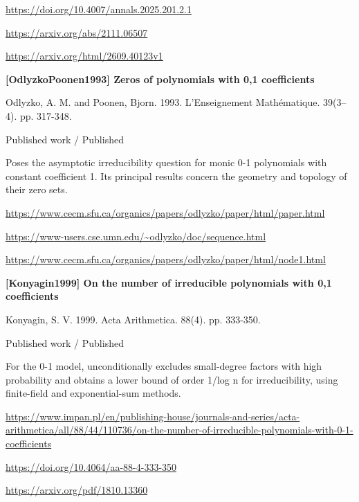 \documentclass[11pt,a4paper,oneside,openany]{book}
\begin{document}
{\footnotesize\url{https://doi.org/10.4007/annals.2025.201.2.1}}\par
{\footnotesize\url{https://arxiv.org/abs/2111.06507}}\par
{\footnotesize\url{https://arxiv.org/html/2609.40123v1}}\par
\vspace{9pt}
\hypertarget{ref:OdlyzkoPoonen1993}{}
{\sffamily\bfseries\color{atlasgreen}[OdlyzkoPoonen1993] Zeros of polynomials with 0,1 coefficients}\par
\color{black} Odlyzko, A. M. and Poonen, Bjorn. 1993. L'Enseignement Mathématique. 39(3--4). pp. 317-348.\par
{\small\sffamily\color{atlasgold}Published work / Published}\par
\color{black} Poses the asymptotic irreducibility question for monic 0-1 polynomials with constant coefficient 1. Its principal results concern the geometry and topology of their zero sets.\par
{\footnotesize\url{https://www.cecm.sfu.ca/organics/papers/odlyzko/paper/html/paper.html}}\par
{\footnotesize\url{https://www-users.cse.umn.edu/~odlyzko/doc/sequence.html}}\par
{\footnotesize\url{https://www.cecm.sfu.ca/organics/papers/odlyzko/paper/html/node1.html}}\par
\vspace{9pt}
\hypertarget{ref:Konyagin1999}{}
{\sffamily\bfseries\color{atlasgreen}[Konyagin1999] On the number of irreducible polynomials with 0,1 coefficients}\par
\color{black} Konyagin, S. V. 1999. Acta Arithmetica. 88(4). pp. 333-350.\par
{\small\sffamily\color{atlasgold}Published work / Published}\par
\color{black} For the 0-1 model, unconditionally excludes small-degree factors with high probability and obtains a lower bound of order 1/log n for irreducibility, using finite-field and exponential-sum methods.\par
{\footnotesize\url{https://www.impan.pl/en/publishing-house/journals-and-series/acta-arithmetica/all/88/44/110736/on-the-number-of-irreducible-polynomials-with-0-1-coefficients}}\par
{\footnotesize\url{https://doi.org/10.4064/aa-88-4-333-350}}\par
{\footnotesize\url{https://arxiv.org/pdf/1810.13360}}\par
\end{document}
